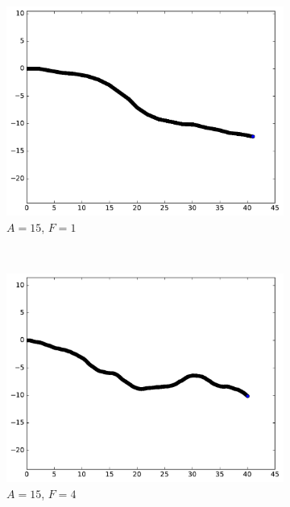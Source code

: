 	\newcommand{\subImgWarea}{0.42\textwidth}
	\begin{figure}[htb]
		\begin{subfigure}[t]{\subImgWmo}
			\centering
			\includegraphics[width=\textwidth]{figures/ch3/synTraj_219_15_1}
			\caption[$A = 15$, $F=1$]{$A = 15$, $F=1$}
			\label{fig:synTraj_219_15_1}
		\end{subfigure}
		~
		\begin{subfigure}[t]{\subImgWmo}
			\centering
			\includegraphics[width=\textwidth]{figures/ch3/synTraj_219_15_4}
			\caption[$A = 15$, $F=4$]{$A = 15$, $F=4$}
			\label{fig:synTraj_219_15_4}
		\end{subfigure}
		~
		\begin{subfigure}[t]{\subImgWmo}

\end{subfigure}
\end{figure}
